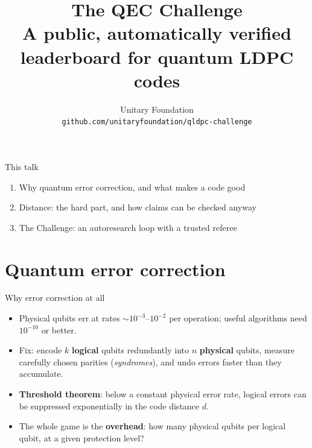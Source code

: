 \documentclass[11pt,aspectratio=169]{beamer}
\title{\textbf{The QEC Challenge}\\[6pt]
  \large A public, automatically verified leaderboard for quantum LDPC codes}
\author{Unitary Foundation\\[2pt]
  \texttt{github.com/unitaryfoundation/qldpc-challenge}}
\date{}
\begin{document}
\begin{frame}
  \titlepage
\end{frame}

\begin{frame}{This talk}
  \begin{enumerate}\setlength{\itemsep}{10pt}
    \item Why quantum error correction, and what makes a code good
    \item Distance: the hard part, and how claims can be checked anyway
    \item The Challenge: an autoresearch loop with a trusted referee
  \end{enumerate}
\end{frame}

\section{Quantum error correction}

\begin{frame}{Why error correction at all}
  \begin{itemize}\setlength{\itemsep}{8pt}
    \item Physical qubits err at rates $\sim 10^{-3}$--$10^{-2}$ per operation;
          useful algorithms need $10^{-10}$ or better.
    \item Fix: encode $k$ \textbf{logical} qubits redundantly into $n$
          \textbf{physical} qubits, measure carefully chosen parities
          (\emph{syndromes}), and undo errors faster than they accumulate.
    \item \textbf{Threshold theorem}: below a constant physical error rate, logical
          errors can be suppressed exponentially in the code distance $d$.
    \item The whole game is the \textbf{overhead}: how many physical qubits per
          logical qubit, at a given protection level?
  \end{itemize}
\end{frame}
\end{document}
